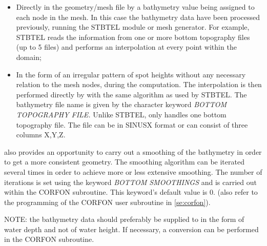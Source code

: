 \begin{itemize}
\item  Directly in the geometry/mesh file by a bathymetry value being assigned to each node in the mesh. In this case the bathymetry data have been processed previously, running the STBTEL module or mesh generator. For example, STBTEL reads the information from one or more bottom topography files (up to 5 files) and performs an interpolation at every point within the domain;

\item  In the form of an irregular pattern of spot heights without any necessary relation to the mesh nodes, during the \tomawac computation. The interpolation is then performed directly by \tomawac with the same algorithm as used by STBTEL. The bathymetry file name is given by the character keyword \textit{BOTTOM TOPOGRAPHY FILE. }Unlike STBTEL, \tomawac only handles one bottom topography file. The file can be in SINUSX format or can consist of three columns X,Y,Z.
\end{itemize}

 \tomawac also provides an opportunity to carry out a smoothing of the bathymetry in order to get a more consistent geometry. The smoothing algorithm can be iterated several times in order to achieve more or less extensive smoothing. The number of iterations is set using the keyword \textit{BOTTOM SMOOTHINGS} and is carried out within the CORFON subroutine. This keyword's default value is 0. (also refer to the programming of the CORFON user subroutine in \ref{se:corfon}).

 NOTE: the bathymetry data should preferably be supplied to \tomawac in the form of water depth and not of water height. If necessary, a conversion can be performed in the CORFON subroutine.


